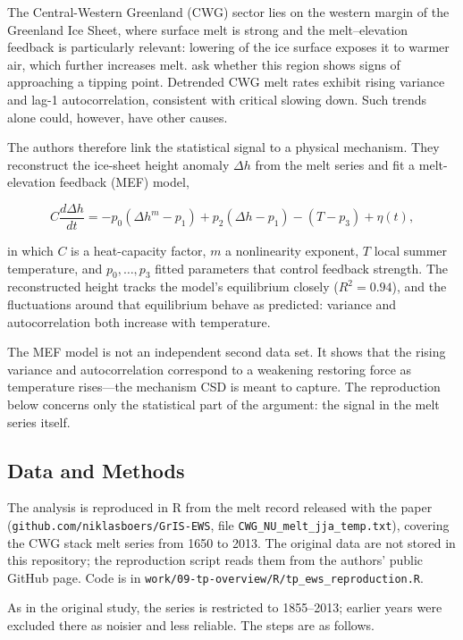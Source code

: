 \documentclass[
]{krantz}
\begin{document}
The Central-Western Greenland (CWG) sector lies on the western margin of
the Greenland Ice Sheet, where surface melt is strong and the
melt--elevation feedback is particularly relevant: lowering of the ice
surface exposes it to warmer air, which further increases melt. \citet{boers2021}
ask whether this region shows signs of approaching a tipping point.
Detrended CWG melt rates exhibit rising variance and lag-1 autocorrelation,
consistent with critical slowing down. Such trends alone could, however,
have other causes.

The authors therefore link the statistical signal to a physical mechanism.
They reconstruct the ice-sheet height anomaly \(\Delta h\) from the melt
series and fit a melt-elevation feedback (MEF) model,

\[
C \frac{d\Delta h}{dt} = -p_0 (\Delta h^m - p_1) + p_2 (\Delta h - p_1) - (T - p_3) + \eta(t),
\]

in which \(C\) is a heat-capacity factor, \(m\) a nonlinearity exponent,
\(T\) local summer temperature, and \(p_0,\dots,p_3\) fitted parameters that
control feedback strength. The reconstructed height tracks the model's
equilibrium closely (\(R^2 = 0.94\)), and the fluctuations around that
equilibrium behave as predicted: variance and autocorrelation both
increase with temperature.

The MEF model is not an independent second data set. It shows that the
rising variance and autocorrelation correspond to a weakening restoring
force as temperature rises---the mechanism CSD is meant to capture. The
reproduction below concerns only the statistical part of the argument: the
signal in the melt series itself.

\subsection{Data and Methods}\label{data-and-methods-1}

The analysis is reproduced in R from the melt record released with the
paper (\texttt{github.com/niklasboers/GrIS-EWS}, file
\texttt{CWG\_NU\_melt\_jja\_temp.txt}), covering the CWG stack melt series from 1650
to 2013. The original data are not stored in this repository; the
reproduction script reads them from the authors' public GitHub page.
Code is in \texttt{work/09-tp-overview/R/tp\_ews\_reproduction.R}.

As in the original study, the series is restricted to 1855--2013; earlier
years were excluded there as noisier and less reliable. The steps are as
follows.
\end{document}
